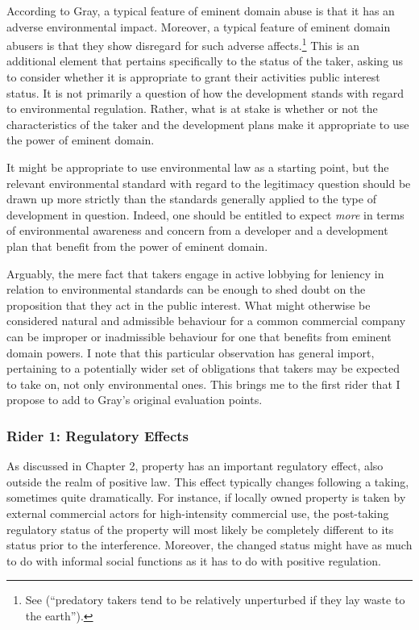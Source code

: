 According to Gray, a typical feature of eminent domain abuse is that it has an adverse environmental impact. Moreover, a typical feature of eminent domain abusers is that they show disregard for such adverse affects.\footnote{See \cite[34]{gray11} (``predatory takers tend to be relatively unperturbed if they lay waste to the earth'').} This is an additional element that pertains specifically to the status of the taker, asking us to consider whether it is appropriate to grant their activities public interest status. It is not primarily a question of how the development stands with regard to environmental regulation. Rather, what is at stake is whether or not the characteristics of the taker and the development plans make it appropriate to use the power of eminent domain. 

It might be appropriate to use environmental law as a starting point, but the relevant environmental standard with regard to the legitimacy question should be drawn up more strictly than the standards generally applied to the type of development in question. Indeed, one should be entitled to expect {\it more} in terms of environmental awareness and concern from a developer and a development plan that benefit from the power of eminent domain. 

Arguably, the mere fact that takers engage in active lobbying for leniency in relation to environmental standards can be enough to shed doubt on the proposition that they act in the public interest. What might otherwise be considered natural and admissible behaviour for a common commercial company can be improper or inadmissible behaviour for one that benefits from eminent domain powers. I note that this particular observation has general import, pertaining to a potentially wider set of obligations that takers may be expected to take on, not only environmental ones. This brings me to the first rider that I propose to add to Gray's original evaluation points.

\subsubsection*{Rider 1: Regulatory Effects}

As discussed in Chapter 2, property has an important regulatory effect, also outside the realm of positive law. This effect typically changes following a taking, sometimes quite dramatically.  For instance, if locally owned property is taken by external commercial actors for high-intensity commercial use, the post-taking regulatory status of the property will most likely be completely different to its status prior to the interference. Moreover, the changed status might have as much to do with informal social functions as it has to do with positive regulation.

